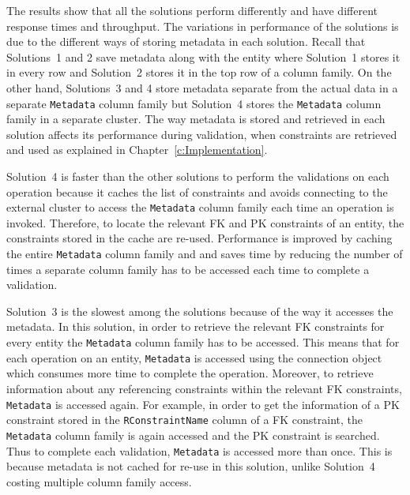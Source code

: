 
The results show that all the solutions perform differently and have different
response times and throughput. The variations in  performance of the solutions
is due to the different ways of storing  metadata in each solution. Recall that
Solutions~1 and 2 save metadata along with the entity where Solution~1 stores it
in every row and Solution~2 stores it in the top row of a column family. On the
other hand, Solutions~3 and 4 store metadata separate from the actual data  in a
separate \texttt{Metadata} column family but Solution~4 stores the
\texttt{Metadata} column family in a separate cluster. The way metadata is
stored and retrieved in each solution affects its performance during validation,
when constraints are retrieved and used as explained in Chapter~\ref{c:Implementation}.

Solution~4  is faster than the other solutions to perform the validations on
each operation because it caches the list of constraints and avoids connecting
to the external cluster to access the \texttt{Metadata} column family each time
an operation is invoked. Therefore, to locate the relevant \ac{FK} and \ac{PK}
constraints of an entity, the constraints stored in the cache are re-used.
Performance is improved by caching the entire \texttt{Metadata} column family
and and saves time by reducing the number of times a separate column family has
to be accessed each time to complete a validation.

Solution~3 is the slowest among the solutions because of the way it accesses the
metadata.
In this solution, in order to retrieve the relevant \ac{FK} constraints for
every entity the \texttt{Metadata} column family has to be accessed. This means
that for each operation on an entity, \texttt{Metadata} is accessed using the
connection object which consumes more time to complete the operation. Moreover,
to retrieve information about any referencing constraints within the relevant
\ac{FK} constraints, \texttt{Metadata} is accessed again. For example, in
order to get the information of a \ac{PK} constraint stored in the
\texttt{RConstraintName} column of a \ac{FK} constraint, the \texttt{Metadata}
column family is again accessed and the \ac{PK} constraint is searched. Thus to
complete each validation, \texttt{Metadata} is accessed more than once.
This is because metadata is not cached for re-use in this solution, unlike
Solution~4 costing multiple column family access.

